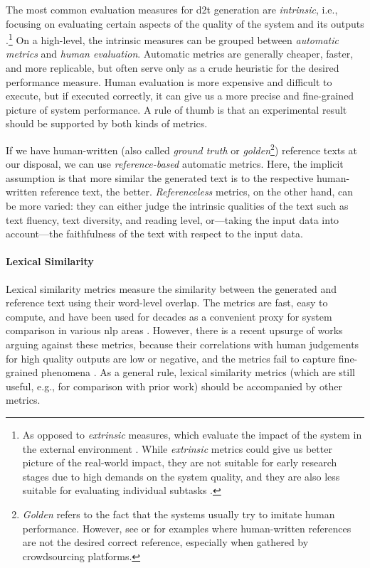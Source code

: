{The most common evaluation measures for \ac{d2t} generation are \emph{intrinsic}, i.e., focusing on evaluating certain aspects of the quality of the system and its outputs \cite{gkatzia2015snapshot,celikyilmazEvaluationTextGeneration2021}.\footnote{As opposed to \emph{extrinsic} measures, which evaluate the impact of the system in the external environment \cite{celikyilmazEvaluationTextGeneration2021}. While \emph{extrinsic} metrics could give us better picture of the real-world impact, they are not suitable for early research stages due to high demands on the system quality, and they are also less suitable for evaluating individual subtasks \cite{van2019best}.} On a high-level, the intrinsic measures can be grouped between \emph{automatic metrics} and \emph{human evaluation}. Automatic metrics are generally cheaper, faster, and more replicable, but often serve only as a crude heuristic for the desired performance measure. Human evaluation is more expensive and difficult to execute, but if executed correctly, it can give us a more precise and fine-grained picture of system performance. A rule of thumb is that an experimental result should be supported by both kinds of metrics.


If we have human-written (also called \emph{ground truth} or \emph{golden}\footnote{\emph{Golden} refers to the fact that the systems usually try to imitate human performance. However, see \citet{clarkAllThatHuman2021} or \citet{dusekSemanticNoiseMatters2019} for examples where human-written references are not the desired correct reference, especially when gathered by crowdsourcing platforms.}) reference texts at our disposal, we can use \emph{reference-based}  automatic metrics. Here, the implicit assumption is that more similar the generated text is to the respective human-written reference text, the better. \emph{Referenceless} metrics, on the other hand, can be more varied: they can either judge the intrinsic qualities of the text such as text fluency, text diversity, and reading level, or---taking the input data into account---the faithfulness of the text with respect to the input data.


\paragraph{Lexical Similarity} Lexical similarity metrics measure the similarity between the generated and reference text using their word-level overlap. The metrics are fast, easy to compute, and have been used for decades as a convenient proxy for system comparison in various \ac{nlp} areas \cite{celikyilmazEvaluationTextGeneration2021}. However, there is a recent upsurge of works arguing against these metrics, because their correlations with human judgements for high quality outputs are low or negative, and the metrics fail to capture fine-grained phenomena \cite{mathurTangledBLEUReevaluating2020,kocmiShipNotShip2021,gehrmannRepairingCrackedFoundation2022}. As a general rule, lexical similarity metrics (which are still useful, e.g., for comparison with prior work) should be accompanied by other metrics.

}
